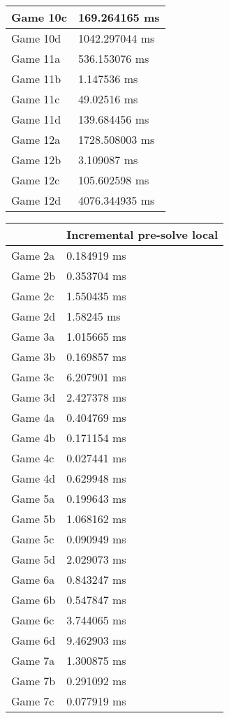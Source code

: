 \begin{tabular}{|l|l|}
	Game 10c & 169.264165 ms \\ \hline
	Game 10d & 1042.297044 ms \\ \hline
	Game 11a & 536.153076 ms \\ \hline
	Game 11b & 1.147536 ms \\ \hline
	Game 11c & 49.02516 ms \\ \hline
	Game 11d & 139.684456 ms \\ \hline
	Game 12a & 1728.508003 ms \\ \hline
	Game 12b & 3.109087 ms \\ \hline
	Game 12c & 105.602598 ms \\ \hline
	Game 12d & 4076.344935 ms \\ \hline
\end{tabular}
\begin{tabular}{|l|l|}
	\hline
	& Incremental pre-solve local \\ \hline
	Game 2a & 0.184919 ms \\ \hline
	Game 2b & 0.353704 ms \\ \hline
	Game 2c & 1.550435 ms \\ \hline
	Game 2d & 1.58245 ms \\ \hline
	Game 3a & 1.015665 ms \\ \hline
	Game 3b & 0.169857 ms \\ \hline
	Game 3c & 6.207901 ms \\ \hline
	Game 3d & 2.427378 ms \\ \hline
	Game 4a & 0.404769 ms \\ \hline
	Game 4b & 0.171154 ms \\ \hline
	Game 4c & 0.027441 ms \\ \hline
	Game 4d & 0.629948 ms \\ \hline
	Game 5a & 0.199643 ms \\ \hline
	Game 5b & 1.068162 ms \\ \hline
	Game 5c & 0.090949 ms \\ \hline
	Game 5d & 2.029073 ms \\ \hline
	Game 6a & 0.843247 ms \\ \hline
	Game 6b & 0.547847 ms \\ \hline
	Game 6c & 3.744065 ms \\ \hline
	Game 6d & 9.462903 ms \\ \hline
	Game 7a & 1.300875 ms \\ \hline
	Game 7b & 0.291092 ms \\ \hline
	Game 7c & 0.077919 ms \\ \hline

\end{tabular}
